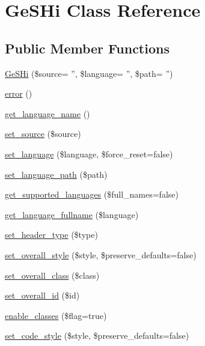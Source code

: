 \hypertarget{class_ge_s_hi}{\section{Ge\-S\-Hi Class Reference}
\label{class_ge_s_hi}
}
\subsection*{Public Member Functions}
\begin{DoxyCompactItemize}
\item 
\hyperlink{class_ge_s_hi_a412055a65982b44e5cb73f76de5f2829}{Ge\-S\-Hi} (\$source= '', \$language= '', \$path= '')
\item 
\hyperlink{class_ge_s_hi_ae6b1b64028fe60fbb3c8aaf420793578}{error} ()
\item 
\hyperlink{class_ge_s_hi_a09f8d1f4f597ffaa486f4792415caa1b}{get\-\_\-language\-\_\-name} ()
\item 
\hyperlink{class_ge_s_hi_afae4820fed4615380c073cb2ffdaffff}{set\-\_\-source} (\$source)
\item 
\hyperlink{class_ge_s_hi_a0b0ff783617df971bd15d402bc64b84a}{set\-\_\-language} (\$language, \$force\-\_\-reset=false)
\item 
\hyperlink{class_ge_s_hi_abb84f83f6ed54294258f4a20ced3cd1d}{set\-\_\-language\-\_\-path} (\$path)
\item 
\hyperlink{class_ge_s_hi_a3519eabcd822324b2588633241566fb4}{get\-\_\-supported\-\_\-languages} (\$full\-\_\-names=false)
\item 
\hyperlink{class_ge_s_hi_aed5bec431b8e4f02188a5285b269d482}{get\-\_\-language\-\_\-fullname} (\$language)
\item 
\hyperlink{class_ge_s_hi_ad1966006cfc7e60fd6aff0b762e9f593}{set\-\_\-header\-\_\-type} (\$type)
\item 
\hyperlink{class_ge_s_hi_a4c4df05fb94a057ad1aed3845a0c67d9}{set\-\_\-overall\-\_\-style} (\$style, \$preserve\-\_\-defaults=false)
\item 
\hyperlink{class_ge_s_hi_a4de2ab19cbe5f6c3da8f49e60a346608}{set\-\_\-overall\-\_\-class} (\$class)
\item 
\hyperlink{class_ge_s_hi_aceb3ebcf9a7842d6431da4f35244b5e3}{set\-\_\-overall\-\_\-id} (\$id)
\item 
\hyperlink{class_ge_s_hi_a7dcd5d790a4335f8af0c22277309a015}{enable\-\_\-classes} (\$flag=true)
\item 
\hyperlink{class_ge_s_hi_afae2007c1f25a51aaaee0725b9cac1ed}{set\-\_\-code\-\_\-style} (\$style, \$preserve\-\_\-defaults=false)

\end{DoxyCompactItemize}
